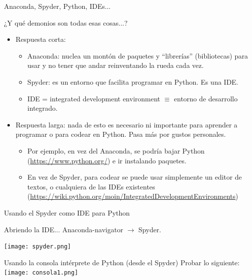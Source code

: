 \documentclass{beamer}
\begin{document}
\begin{frame}{Anaconda, Spyder, Python, IDEs...}
\begin{block}{¿Y qué demonios son todas esas cosas...?}\pause
\begin{itemize}
	\item Respuesta corta:\pause
		\begin{itemize}
			\item Anaconda: nuclea un montón de paquetes y ``librerías'' (bibliotecas) para usar y no tener que andar reinventando la rueda cada vez.\pause
			\item Spyder: es un entorno que facilita programar en Python. Es una IDE.\pause
			\item IDE = integrated development environment $\equiv$ entorno de desarrollo integrado.\pause
		\end{itemize}
	\item Respuesta larga: nada de esto es necesario ni importante para aprender a programar o para codear en Python. Pasa más por gustos personales.\pause
	\begin{itemize}
		\item Por ejemplo, en vez del Anaconda, se podría bajar Python (\footnotesize\url{https://www.python.org/}) e ir instalando paquetes.\pause
		\item En vez de Spyder, para codear se puede usar simplemente un editor de textos, o cualquiera de las IDEs existentes (\footnotesize\url{https://wiki.python.org/moin/IntegratedDevelopmentEnvironments})
	\end{itemize}
\end{itemize}
\end{block}
\end{frame}


\begin{frame}{Usando el Spyder como IDE para Python}
\begin{block}{Abriendo la IDE...}
Anaconda-navigator $\to$ Spyder.\pause
\end{block}


\texttt{[image: spyder.png]}

\end{frame}



\begin{frame}{Usando la consola intérprete de Python (desde el Spyder)}
Probar lo siguiente:
\texttt{[image: consola1.png]}

\end{frame}
\end{document}
